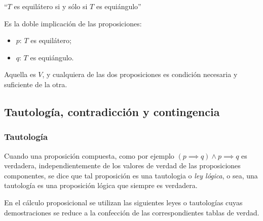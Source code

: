 \begin{fmd-example}
	``$T$ es equilátero si y sólo si $T$ es equiángulo''
	
	Es la doble implicación de las proposiciones:
	\begin{itemize}
		\item $p$: $T$ es equilátero;
		\item $q$: $T$ es equiángulo.
	\end{itemize}
	Aquella es $V$, y cualquiera de las dos proposiciones es condición necesaria y suficiente de la otra.
\end{fmd-example}

\subsection{Tautología, contradicción y contingencia}

\subsubsection{Tautología} 
\vspace{1em}
\begin{fmd-definition}[Tautología]
	Cuando una proposición compuesta, como por ejemplo $(p \implies q) \land p \implies q$ es verdadera, independientemente de los valores de verdad de las proposiciones componentes, se dice que tal proposición es una \gls{tautologia} o \textit{ley lógica}, o sea, una tautología es una proposición lógica que siempre es verdadera.
\end{fmd-definition}

En el cálculo proposicional se utilizan las siguientes leyes o tautologías cuyas demostraciones se reduce a la confección de las correspondientes tablas de verdad.

